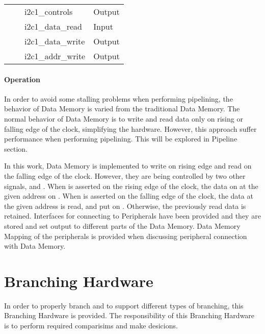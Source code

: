 \begin{table}[!h]
{\begin{tabular}{|l|l|l|l|}
                                                  &                                                                 & i2c1\_controls                             & Output                             \\ \cline{3-4}
                                                  &                                                                 & i2c1\_data\_read                           & Input                              \\ \cline{3-4}
                                                  &                                                                 & i2c1\_data\_write                          & Output                             \\ \cline{3-4}
                                                  &                                                                 & i2c1\_addr\_write                          & Output                             \\ \hline
        \end{tabular}
    }
\end{table}
\paragraph*{Operation}
In order to avoid some stalling problems when performing pipelining, the behavior of Data Memory is varied from the traditional Data Memory.
The normal behavior of Data Memory is to write and read data only on rising or falling edge of the clock, simplifying the hardware.
However, this approach suffer performance when performing pipelining. This will be explored in Pipeline section.



In this work, Data Memory is implemented to write on rising edge and read on the falling edge of the clock.
However, they are being controlled by two other signals,  and .
When  is asserted on the rising edge of the clock, the data on  at the given address on .
When  is asserted on the falling edge of the clock, the data at the given address  is read, and put on .
Otherwise, the previously read data is retained.
Interfaces for connecting to Peripherals have been provided and they are stored and set output to different parts of the Data Memory.
Data Memory Mapping of the peripherals is provided when discussing peripheral connection with Data Memory.

\section{Branching Hardware}
In order to properly branch and to support different types of branching, this Branching Hardware is provided.
The responsibility of this Branching Hardware is to perform required comparisims and make desicions.

